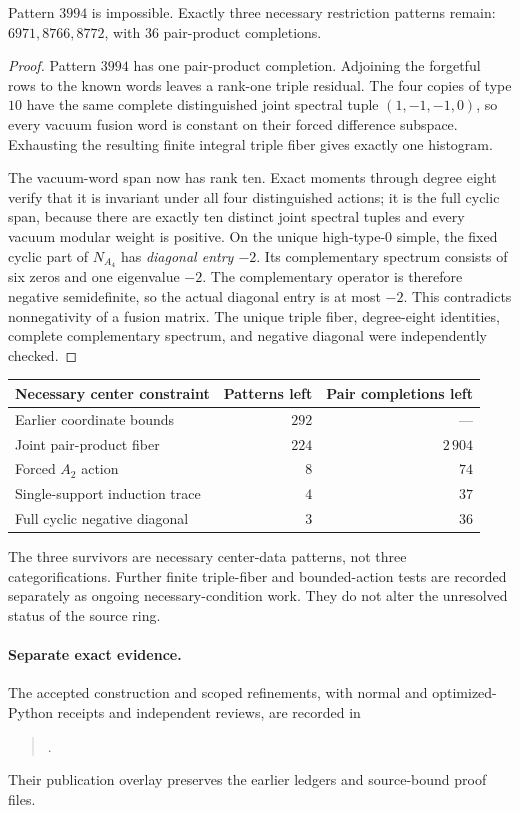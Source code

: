 \begin{proposition}
Pattern $3994$ is impossible.  Exactly three necessary restriction
patterns remain: $6971,8766,8772$, with $36$ pair-product completions.
\end{proposition}
\begin{proof}
Pattern $3994$ has one pair-product completion.  Adjoining the forgetful
rows to the known words leaves a rank-one triple residual.  The four
copies of type $10$ have the same complete distinguished joint spectral
tuple $(1,-1,-1,0)$, so every vacuum fusion word is constant on their
forced difference subspace.  Exhausting the resulting finite integral
triple fiber gives exactly one histogram.

The vacuum-word span now has rank ten.  Exact moments through degree eight
verify that it is invariant under all four distinguished actions; it is
the full cyclic span, because there are exactly ten distinct joint
spectral tuples and every vacuum modular weight is positive.  On the
unique high-type-$0$ simple, the fixed cyclic part of $N_{A_4}$ has
\emph{diagonal entry $-2$}.  Its complementary spectrum consists of six
zeros and one eigenvalue $-2$.  The complementary operator is therefore
negative semidefinite, so the actual diagonal entry is at most $-2$.
This contradicts nonnegativity of a fusion matrix.  The unique triple
fiber, degree-eight identities, complete complementary spectrum, and
negative diagonal were independently checked.
\end{proof}

\begin{center}
\begin{tabular}{lrr}
Necessary center constraint & Patterns left & Pair completions left\\
\hline
Earlier coordinate bounds & $292$ & ---\\
Joint pair-product fiber & $224$ & $2\,904$\\
Forced $A_2$ action & $8$ & $74$\\
Single-support induction trace & $4$ & $37$\\
Full cyclic negative diagonal & $3$ & $36$
\end{tabular}
\end{center}

The three survivors are necessary center-data patterns, not three
categorifications.  Further finite triple-fiber and bounded-action tests
are recorded separately as ongoing necessary-condition work.  They do
not alter the unresolved status of the source ring.

\paragraph{Separate exact evidence.}
The accepted construction and scoped refinements, with normal and
optimized-Python receipts and independent reviews, are recorded in
\begin{quote}\small{}.\end{quote}
Their publication overlay preserves
the earlier ledgers and source-bound proof files.
